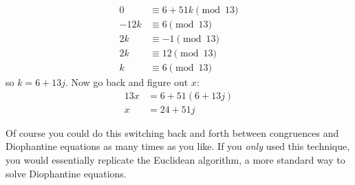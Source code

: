 \documentclass[12pt]{article}
\begin{document}
\[
\begin{aligned}
0 &\equiv 6 + 51k \pmod{13}\\
-12k &\equiv 6 \pmod{13}\\
2k &\equiv -1 \pmod{13}\\
2k &\equiv 12 \pmod{13}\\
k &\equiv 6 \pmod{13}
\end{aligned}
\]
so $k = 6 + 13j$.  Now go back and figure out $x$:
\[
\begin{aligned}
13x & = 6 + 51(6+13j)\\
x & = 24 + 51j
\end{aligned}
\]

Of course you could do this switching back and forth between congruences and Diophantine equations as many times as you like.  If you {\em only} used this technique, you would essentially replicate the Euclidean algorithm, a more standard way to solve Diophantine equations. 
\end{document}

